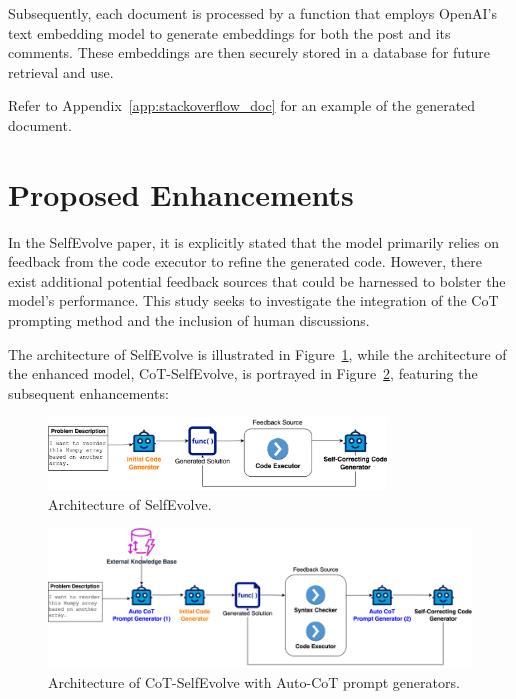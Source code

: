 \documentclass[a4paper,oneside]{book}
\begin{document}
Subsequently, each document is processed by a function that employs OpenAI's text embedding model to generate embeddings for both the post and its comments. These embeddings are then securely stored in a database for future retrieval and use.

Refer to Appendix~\ref{app:stackoverflow_doc} for an example of the generated document.

\section{Proposed Enhancements}
In the SelfEvolve paper, it is explicitly stated that the model primarily relies on feedback from the code executor to refine the generated code. However, there exist additional potential feedback sources that could be harnessed to bolster the model's performance. This study seeks to investigate the integration of the CoT prompting method and the inclusion of human discussions.

The architecture of SelfEvolve is illustrated in Figure~\ref{fig:selfevolve_architecture}, while the architecture of the enhanced model, CoT-SelfEvolve, is portrayed in Figure~\ref{fig:cot_selfevolve_architecture}, featuring the subsequent enhancements:

\newpage
\begin{figure}[H]
  \centering
  \includegraphics[width=0.8\textwidth]{img/selfevolve_architecture}
  \caption{Architecture of SelfEvolve.}\label{fig:selfevolve_architecture}
\end{figure}

\begin{figure}[H]
  \centering
  \includegraphics[width=1.0\textwidth]{img/cot_selfevolve_architecture}
  \caption{Architecture of CoT-SelfEvolve with Auto-CoT prompt generators.}\label{fig:cot_selfevolve_architecture}
\end{figure}
\end{document}
